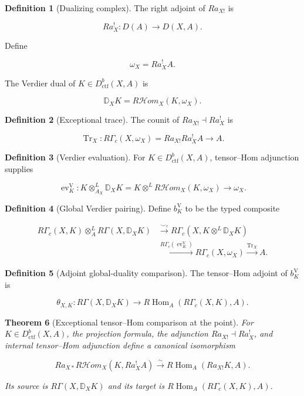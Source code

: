 \documentclass[10pt]{article}
\newtheorem{theorem}{Theorem}[section]
\theoremstyle{definition}
\newtheorem{definition}[theorem]{Definition}
\newcommand{\Dctf}{D^b_{\mathrm{ctf}}}
\newcommand{\RHom}{R\mathcal Hom}
\newcommand{\RG}{R\Gamma}
\newcommand{\RGc}{R\Gamma_c}
\newcommand{\DD}{\mathbb D}
\newcommand{\Tr}{\operatorname{Tr}}
\begin{document}
\begin{definition}[Dualizing complex]
The right adjoint of \(Ra_{X!}\) is

\[
 Ra_X^!:D(A)\longrightarrow D(X,A).
\]

Define

\[
 \omega_X=Ra_X^!A.
\]

The Verdier dual of \(K\in\Dctf(X,A)\) is

\[
 \DD_XK=\RHom_X(K,\omega_X).
\]
\end{definition}

\begin{definition}[Exceptional trace]
The counit of \(Ra_{X!}\dashv Ra_X^!\) is

\[
 \Tr_X:\RGc(X,\omega_X)=Ra_{X!}Ra_X^!A\longrightarrow A.
\]
\end{definition}

\begin{definition}[Verdier evaluation]
For \(K\in\Dctf(X,A)\), tensor--Hom adjunction supplies

\[
 \operatorname{ev}^{\mathrm V}_K:
 K\otimes^L_{A_X}\DD_XK
 =K\otimes^L\RHom_X(K,\omega_X)\longrightarrow\omega_X.
\]
\end{definition}

\begin{definition}[Global Verdier pairing]
Define \(b^{\mathrm V}_K\) to be the typed composite

\[
\begin{aligned}
 \RGc(X,K)\otimes_A^L\RG(X,\DD_XK)
 &\xrightarrow{\smile_c}
 \RGc(X,K\otimes^L\DD_XK)\\
 &\xrightarrow{\RGc(\operatorname{ev}^{\mathrm V}_K)}
 \RGc(X,\omega_X)
 \xrightarrow{\Tr_X}A.
\end{aligned}
\]
\end{definition}

\begin{definition}[Adjoint global-duality comparison]
The tensor--Hom adjoint of \(b^{\mathrm V}_K\) is

\[
 \theta_{X,K}:
 \RG(X,\DD_XK)
 \longrightarrow
 R\operatorname{Hom}_A(\RGc(X,K),A).
\]
\end{definition}

\begin{theorem}[Exceptional tensor--Hom comparison at the point]
For \(K\in\Dctf(X,A)\), the projection formula, the adjunction
\(Ra_{X!}\dashv Ra_X^!\), and internal tensor--Hom adjunction define a
canonical isomorphism

\[
 Ra_{X*}\RHom_X(K,Ra_X^!A)
 \xrightarrow{\sim}
 R\operatorname{Hom}_A(Ra_{X!}K,A).
\]

Its source is \(\RG(X,\DD_XK)\) and its target is
\(R\operatorname{Hom}_A(\RGc(X,K),A)\).
\end{theorem}
\end{document}
